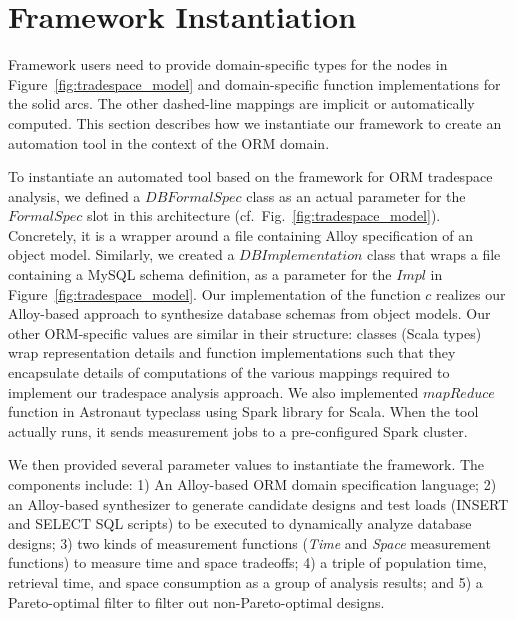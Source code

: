 \documentclass[10pt,conference]{IEEEtran}
\begin{document}
\section{Framework Instantiation}
\label{tool_implementation}
Framework users need to provide domain-specific types for the nodes in Figure~\ref{fig:tradespace_model} and domain-specific function implementations for the solid arcs. The other dashed-line mappings are implicit or automatically computed. %
This section describes how we instantiate our framework to create an automation tool in the context of the ORM domain. 

To instantiate an automated tool based on the framework for ORM tradespace analysis, we defined a $DBFormalSpec$ class as an actual parameter for the $Formal Spec$ slot in this architecture (cf.~Fig.~\ref{fig:tradespace_model}). Concretely, it is a wrapper around a file containing Alloy specification of an object model. Similarly, we created a $DBImplementation$ class that wraps a file containing a MySQL schema definition, as a parameter for the $Impl$ in Figure~\ref{fig:tradespace_model}. Our implementation of the function $c$ realizes our Alloy-based approach to synthesize database schemas from object models. Our other ORM-specific values are similar in their structure: classes (Scala types) wrap representation details and function implementations such that they encapsulate details of computations of the various mappings required to implement our tradespace analysis approach. We also implemented $mapReduce$ function in Astronaut typeclass using Spark library for Scala. When the tool actually runs, it sends measurement jobs to a pre-configured Spark cluster.

We then provided several parameter values to instantiate the framework. The components include: 1) An Alloy-based ORM domain specification language; 2) an Alloy-based synthesizer to generate candidate designs and test loads (INSERT and SELECT SQL scripts) to be executed to dynamically analyze database designs; 3) two kinds of measurement functions ({\em Time} and {\em Space} measurement functions) to measure time and space tradeoffs; 4) a triple of population time, retrieval time, and space consumption as a group of analysis results; and 5) a Pareto-optimal filter to filter out non-Pareto-optimal designs.
\end{document}
